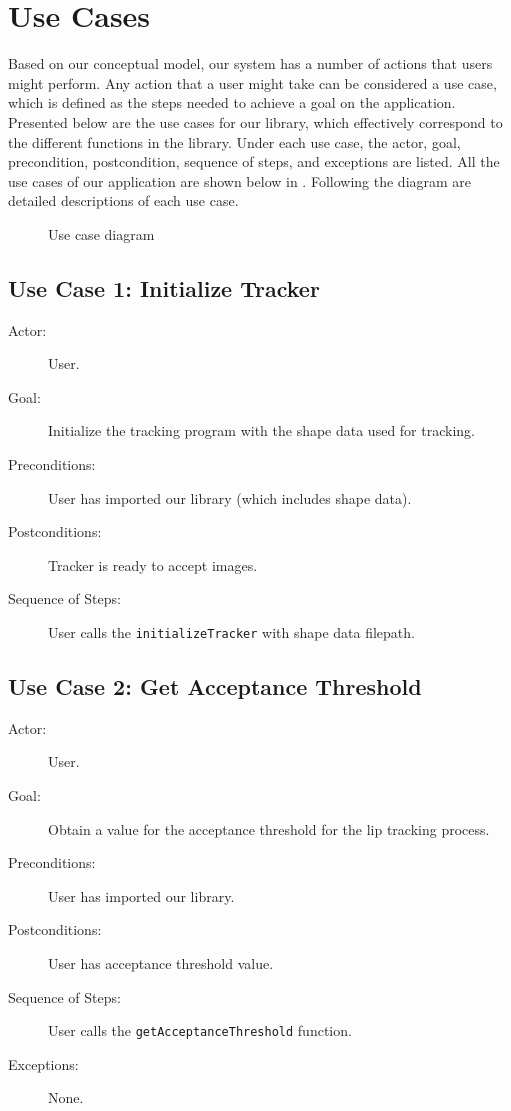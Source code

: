\chapter{Use Cases}
Based on our conceptual model, our system has a number of actions that users might perform. Any action that a user might take can be considered a use case, which is defined as the steps needed to achieve a goal on the application. Presented below are the use cases for our library, which effectively correspond to the different functions in the library. Under each use case, the actor, goal, precondition, postcondition, sequence of steps, and exceptions are listed. All the use cases of our application are shown below in . Following the diagram are detailed descriptions of each use case.

\begin{figure}[!h]
	\noindent\centering\resizebox{0.8\textwidth}{!}{
		
	}
	\caption{Use case diagram}
	\label{fig:use-cases}
\end{figure}

\section{Use Case 1: Initialize Tracker}

\begin{description}
	\item[Actor:] User.
	\item[Goal:] Initialize the tracking program with the shape data used for tracking.
	\item[Preconditions:] User has imported our library (which includes shape data).
	\item[Postconditions:] Tracker is ready to accept images.
	\item[Sequence of Steps:] User calls the \texttt{initializeTracker} with shape data filepath.
\end{description}

\section{Use Case 2: Get Acceptance Threshold}

\begin{description}
	\item[Actor:] User.
	\item[Goal:] Obtain a value for the acceptance threshold for the lip tracking process.
	\item[Preconditions:] User has imported our library.
	\item[Postconditions:] User has acceptance threshold value.
	\item[Sequence of Steps:] User calls the \texttt{getAcceptanceThreshold} function.
	\item[Exceptions:] None.
\end{description}


